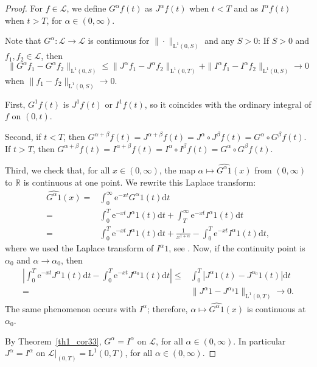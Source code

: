 \documentclass[12pt,reqno]{amsart}
\theoremstyle{plain}
\numberwithin{equation}{section} %
\begin{document}
\begin{proof}
For $f\in\mathcal{L}$, we define $G^\alpha f(t)$ as $J^\alpha f(t)$ when $t<T$ and as $I^\alpha f(t)$ when $t>T$, for $\alpha\in (0,\infty)$. 

Note that $G^\alpha:\mathcal{L}\rightarrow \mathcal{L}$ is continuous for $\|\cdot\|_{\mathrm{L}^1(0,S)}$ and any $S>0$: If $S>0$ and $f_1,f_2\in\mathcal{L}$, then
\[
\|G^\alpha f_1-G^\alpha f_2\|_{\mathrm{L}^1(0,S)}\leq \|J^\alpha f_1-J^\alpha f_2\|_{\mathrm{L}^1(0,T)}+\|I^\alpha f_1-I^\alpha f_2\|_{\mathrm{L}^1(0,S)}\longrightarrow 0 \]
when $\|f_1-f_2\|_{\mathrm{L}^1(0,S)}\rightarrow0$.

First, $G^1 f(t)$ is $J^1 f(t)$ or $I^1f(t)$, so it coincides with the ordinary integral of $f$ on $(0,t)$.

Second, if $t<T$, then $G^{\alpha+\beta} f(t)=J^{\alpha+\beta} f(t)=J^\alpha\circ J^\beta f(t)=G^\alpha\circ G^\beta f(t)$. If $t>T$, then $G^{\alpha+\beta} f(t)=I^{\alpha+\beta} f(t)=I^\alpha\circ I^\beta f(t)=G^\alpha\circ G^\beta f(t)$.

Third, we check that, for all $x\in (0,\infty)$, the map $\alpha\mapsto \widehat{G^{\alpha}1}(x)$ from $(0,\infty)$ to $\mathbb{R}$ is continuous at one point. We rewrite this Laplace transform:
\begin{align*}
 \widehat{G^{\alpha}1}(x)= {} & \int_0^\infty \mathrm{e}^{-xt} G^\alpha 1(t)\mathrm{d}t \\
= {} & \int_0^T \mathrm{e}^{-xt} J^\alpha 1(t)\mathrm{d}t+\int_T^\infty \mathrm{e}^{-xt} I^\alpha 1(t)\mathrm{d}t\\
= {} & \int_0^T \mathrm{e}^{-xt} J^\alpha 1(t)\mathrm{d}t+\frac{1}{x^{1+\alpha}}-\int_0^T \mathrm{e}^{-xt} I^\alpha 1(t)\mathrm{d}t,
\end{align*}
where we used the Laplace transform of $I^\alpha 1$, see \cite[Theorem~7.1]{diethelm}. Now, if the continuity point is $\alpha_0$ and $\alpha\rightarrow\alpha_0$, then
\begin{align*}
 \left|\int_0^T \mathrm{e}^{-xt} J^\alpha 1(t)\mathrm{d}t-\int_0^T \mathrm{e}^{-xt} J^{\alpha_0} 1(t)\mathrm{d}t\right|\leq {} & \int_0^T \left| J^\alpha 1(t)- J^{\alpha_0} 1(t)\right|\mathrm{d}t\\
= {} & \|J^\alpha 1-J^{\alpha_0}1\|_{\mathrm{L}^1(0,T)}\rightarrow 0.
\end{align*}
The same phenomenon occurs with $I^\alpha$; therefore, $\alpha\mapsto \widehat{G^{\alpha}1}(x)$ is continuous at $\alpha_0$.

By Theorem~\ref{th1_cor33}, $G^\alpha=I^\alpha$ on $\mathcal{L}$, for all $\alpha\in (0,\infty)$. In particular $J^\alpha=I^\alpha$ on $\mathcal{L}|_{(0,T)}=\mathrm{L}^1(0,T)$, for all $\alpha\in (0,\infty)$.
\end{proof}
\end{document}
